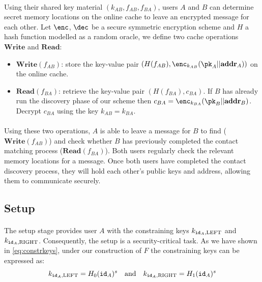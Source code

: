 		\paragraph{} Using their shared key material $(k_{AB}, f_{AB}, f_{BA})$, users $A$ and $B$ can determine secret memory locations on the online cache to leave an encrypted message for each other. Let $\enc$, $\dec$ be a secure symmetric encryption scheme and $H$ a hash function modelled as a random oracle, we define two cache operations $\mathbf{Write}$ and $\mathbf{Read}$:
		\begin{itemize}
			\item $\mathbf{Write}(f_{AB})$: store the key-value pair $(H(f_{AB}), \enc_{k_{AB}}(\pk_A || \addr_A))$ on the online cache.
			\item $\mathbf{Read}(f_{BA})$: retrieve the key-value pair $(H(f_{BA}), c_{BA})$. If $B$ has already run the discovery phase of our scheme then $c_{BA} = \enc_{k_{BA}}(\pk_B||\addr_B)$. Decrypt $c_{BA}$ using the key $k_{AB} = k_{BA}$.
		\end{itemize}
		
		\paragraph{} Using these two operations, $A$ is able to leave a message for $B$ to find ($\mathbf{Write}(f_{AB})$) and check whether $B$ has previously completed the contact matching process ($\mathbf{Read}(f_{BA})$). Both users regularly check the relevant memory locations for a message. Once both users have completed the contact discovery process, they will hold each other's public keys and address, allowing them to communicate securely.
	
	\subsection{Setup}
	\label{sec:setup}
		
		\paragraph{}  The setup stage provides user $A$ with the constraining keys $k_{\mathtt{id}_A,\mathrm{LEFT}}$ and $k_{\mathtt{id}_A,\mathrm{RIGHT}}$. Consequently, the setup is a security-critical task. As we have shown in \autoref{eq:constrkeys}, under our construction of $F$ the constraining keys can be expressed as:
		\begin{equation}
			k_{\mathtt{id}_A,\mathrm{LEFT}} = H_0(\mathtt{id}_A)^s \quad \mathrm{and} \quad k_{\mathtt{id}_A,\mathrm{RIGHT}} = H_1(\mathtt{id}_A)^s
		\end{equation}
		
